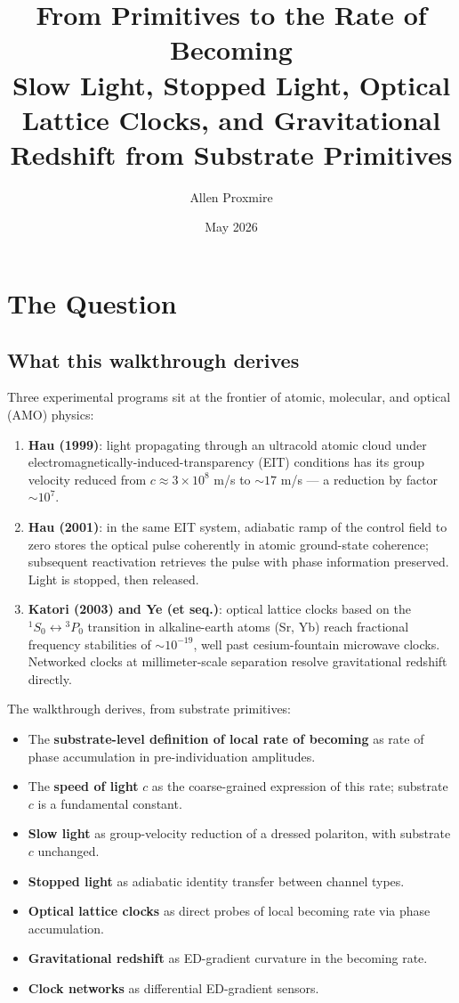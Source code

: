 \documentclass[11pt,a4paper]{article}
\title{\vspace{-1cm}\Large\bfseries From Primitives to the Rate of Becoming\\[6pt]
\large\mdseries Slow Light, Stopped Light, Optical Lattice Clocks, and Gravitational Redshift from Substrate Primitives}
\author{Allen Proxmire}
\date{May 2026}
\begin{document}
\maketitle
\thispagestyle{empty}

\section{The Question}

\subsection*{What this walkthrough derives}

Three experimental programs sit at the frontier of atomic, molecular, and optical (AMO) physics:

\begin{enumerate}[noitemsep]
  \item \textbf{Hau (1999)}: light propagating through an ultracold atomic cloud under electromagnetically-induced-transparency (EIT) conditions has its group velocity reduced from $c \approx 3\times 10^8$ m/s to $\sim 17$ m/s --- a reduction by factor $\sim 10^7$.
  \item \textbf{Hau (2001)}: in the same EIT system, adiabatic ramp of the control field to zero stores the optical pulse coherently in atomic ground-state coherence; subsequent reactivation retrieves the pulse with phase information preserved. Light is stopped, then released.
  \item \textbf{Katori (2003) and Ye (et seq.)}: optical lattice clocks based on the ${}^1S_0 \leftrightarrow {}^3P_0$ transition in alkaline-earth atoms (Sr, Yb) reach fractional frequency stabilities of $\sim 10^{-19}$, well past cesium-fountain microwave clocks. Networked clocks at millimeter-scale separation resolve gravitational redshift directly.
\end{enumerate}

The walkthrough derives, from substrate primitives:

\begin{itemize}[noitemsep]
  \item The \textbf{substrate-level definition of local rate of becoming} as rate of phase accumulation in pre-individuation amplitudes.
  \item The \textbf{speed of light} $c$ as the coarse-grained expression of this rate; substrate $c$ is a fundamental constant.
  \item \textbf{Slow light} as group-velocity reduction of a dressed polariton, with substrate $c$ unchanged.
  \item \textbf{Stopped light} as adiabatic identity transfer between channel types.
  \item \textbf{Optical lattice clocks} as direct probes of local becoming rate via phase accumulation.
  \item \textbf{Gravitational redshift} as ED-gradient curvature in the becoming rate.
  \item \textbf{Clock networks} as differential ED-gradient sensors.
\end{itemize}
\end{document}
